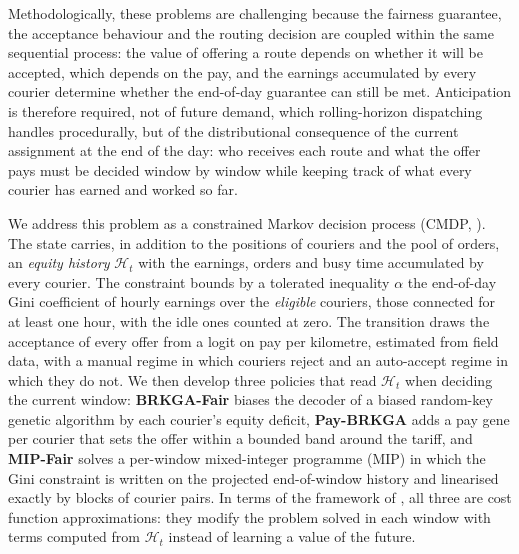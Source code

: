 \documentclass[a4paper,11pt,review,3p,authoryear]{elsarticle}
\newcommand{\Hist}{\mathcal{H}}
\begin{document}
Methodologically, these problems are challenging because the fairness guarantee, the acceptance behaviour and the routing decision are coupled within the same sequential process: the value of offering a route depends on whether it will be accepted, which depends on the pay, and the earnings accumulated by every courier determine whether the end-of-day guarantee can still be met. Anticipation is therefore required, not of future demand, which rolling-horizon dispatching handles procedurally, but of the distributional consequence of the current assignment at the end of the day: who receives each route and what the offer pays must be decided window by window while keeping track of what every courier has earned and worked so far.

We address this problem as a constrained Markov decision process (CMDP, \citealt{altman1999constrained}). The state carries, in addition to the positions of couriers and the pool of orders, an \emph{equity history} $\Hist_t$ with the earnings, orders and busy time accumulated by every courier. The constraint bounds by a tolerated inequality $\alpha$ the end-of-day Gini coefficient of hourly earnings over the \emph{eligible} couriers, those connected for at least one hour, with the idle ones counted at zero. The transition draws the acceptance of every offer from a logit on pay per kilometre, estimated from field data, with a manual regime in which couriers reject and an auto-accept regime in which they do not. We then develop three policies that read $\Hist_t$ when deciding the current window: \textbf{BRKGA-Fair} biases the decoder of a biased random-key genetic algorithm by each courier's equity deficit, \textbf{Pay-BRKGA} adds a pay gene per courier that sets the offer within a bounded band around the tariff, and \textbf{MIP-Fair} solves a per-window mixed-integer programme (MIP) in which the Gini constraint is written on the projected end-of-window history and linearised exactly by blocks of courier pairs. In terms of the framework of \cite{powell2021reinforcement}, all three are cost function approximations: they modify the problem solved in each window with terms computed from $\Hist_t$ instead of learning a value of the future.
\end{document}
